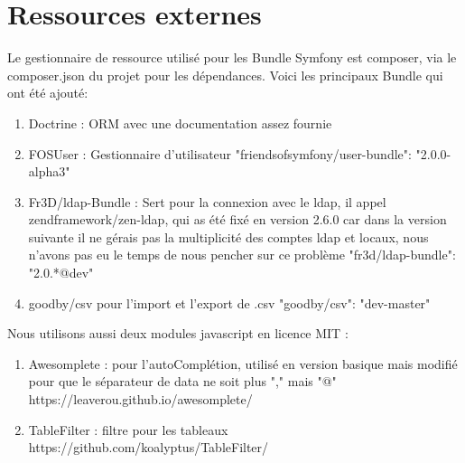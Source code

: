 \chapter{Ressources externes}
Le gestionnaire de ressource utilisé pour les Bundle Symfony est composer, via le composer.json du projet pour les dépendances.
Voici les principaux Bundle qui ont été ajouté:
 \newline
\begin{enumerate}

\item Doctrine : ORM avec une documentation assez fournie
 \newline
 \item FOSUser : Gestionnaire d'utilisateur
 \newline	"friendsofsymfony/user-bundle": "2.0.0-alpha3"
	 \newline
\item Fr3D/ldap-Bundle : Sert pour la connexion avec le ldap, il appel zendframework/zen-ldap, qui as été fixé en version 2.6.0 car dans la version suivante il ne gérais pas la multiplicité des comptes ldap et locaux, nous n'avons pas eu le temps de nous pencher sur ce problème
     \newline    "fr3d/ldap-bundle": "2.0.*@dev"
         \newline
\item goodby/csv pour l'import et l'export de .csv
    \newline     "goodby/csv": "dev-master"
 \newline
\end{enumerate}


Nous utilisons aussi deux modules javascript en licence MIT :

 \begin{enumerate}

\item Awesomplete : pour l'autoComplétion, utilisé en version basique mais modifié pour que le séparateur de data ne soit plus "," mais "@"
\newline https://leaverou.github.io/awesomplete/
	\newline
\item TableFilter : filtre pour les tableaux
\newline https://github.com/koalyptus/TableFilter/	
\newline

\end{enumerate}